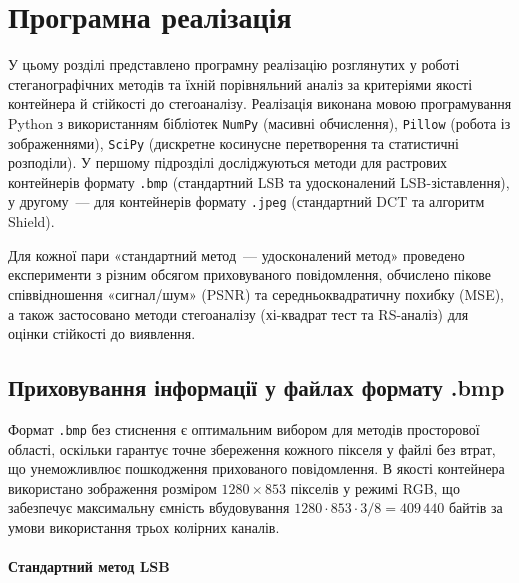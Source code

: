 \chapter{Програмна реалізація}

У цьому розділі представлено програмну реалізацію розглянутих у роботі
стеганографічних методів та їхній порівняльний аналіз за критеріями якості
контейнера й стійкості до стегоаналізу. Реалізація виконана мовою
програмування Python з використанням бібліотек \texttt{NumPy} (масивні
обчислення), \texttt{Pillow} (робота із зображеннями), \texttt{SciPy}
(дискретне косинусне перетворення та статистичні розподіли). У першому
підрозділі досліджуються методи для растрових контейнерів формату
\texttt{.bmp} (стандартний LSB та удосконалений LSB-зіставлення), у
другому~--- для контейнерів формату \texttt{.jpeg} (стандартний DCT та
алгоритм Shield).

Для кожної пари «стандартний метод~--- удосконалений метод» проведено
експерименти з різним обсягом приховуваного повідомлення, обчислено пікове
співвідношення «сигнал/шум» (PSNR) та середньоквадратичну похибку (MSE), а
також застосовано методи стегоаналізу (хі-квадрат тест та RS-аналіз) для
оцінки стійкості до виявлення.

\section{Приховування інформації у файлах формату .bmp}

Формат \texttt{.bmp} без стиснення є оптимальним вибором для методів
просторової області, оскільки гарантує точне збереження кожного пікселя у
файлі без втрат, що унеможливлює пошкодження прихованого повідомлення.
В якості контейнера використано зображення розміром $1280 \times 853$
пікселів у режимі RGB, що забезпечує максимальну ємність вбудовування
$1280 \cdot 853 \cdot 3 / 8 = 409\,440$ байтів за умови використання трьох
колірних каналів.

\subsubsection*{Стандартний метод LSB}

